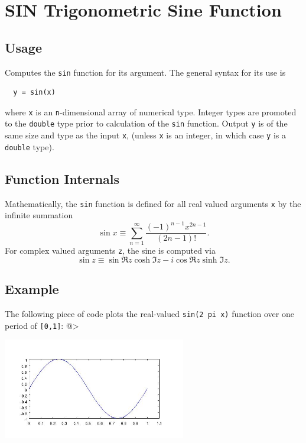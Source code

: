 \section{SIN Trigonometric Sine Function}

\subsection{Usage}

Computes the \verb|sin| function for its argument.  The general
syntax for its use is
\begin{verbatim}
  y = sin(x)
\end{verbatim}
where \verb|x| is an \verb|n|-dimensional array of numerical type.
Integer types are promoted to the \verb|double| type prior to
calculation of the \verb|sin| function.  Output \verb|y| is of the
same size and type as the input \verb|x|, (unless \verb|x| is an
integer, in which case \verb|y| is a \verb|double| type).  
\subsection{Function Internals}

Mathematically, the \verb|sin| function is defined for all real
valued arguments \verb|x| by the infinite summation
\[
  \sin x \equiv \sum_{n=1}^{\infty} \frac{(-1)^{n-1} x^{2n-1}}{(2n-1)!}.
\]
For complex valued arguments \verb|z|, the sine is computed via
\[
  \sin z \equiv \sin \Re z \cosh \Im z - i \cos \Re z
  \sinh \Im z.
\]
\subsection{Example}

The following piece of code plots the real-valued \verb|sin(2 pi x)|
function over one period of \verb|[0,1]|:
@>


\centerline{\includegraphics[width=8cm]{sinplot}}

